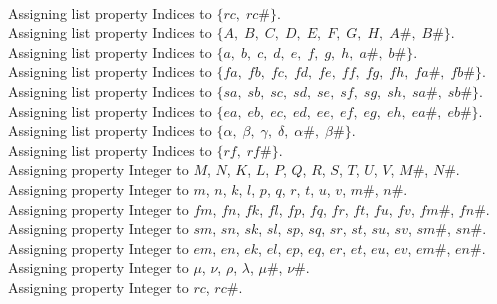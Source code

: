 \documentclass[11pt]{article}
\begin{document}
\\
Assigning list property Indices to $\{rc,\; rc\#\}$.
\\
Assigning list property Indices to $\{A,\; B,\; C,\; D,\; E,\; F,\; G,\; H,\; A\#,\; B\#\}$.
\\
Assigning list property Indices to $\{a,\; b,\; c,\; d,\; e,\; f,\; g,\; h,\; a\#,\; b\#\}$.
\\
Assigning list property Indices to $\{fa,\; fb,\; fc,\; fd,\; fe,\; ff,\; fg,\; fh,\; fa\#,\; fb\#\}$.
\\
Assigning list property Indices to $\{sa,\; sb,\; sc,\; sd,\; se,\; sf,\; sg,\; sh,\; sa\#,\; sb\#\}$.
\\
Assigning list property Indices to $\{ea,\; eb,\; ec,\; ed,\; ee,\; ef,\; eg,\; eh,\; ea\#,\; eb\#\}$.
\\
Assigning list property Indices to $\{\alpha,\; \beta,\; \gamma,\; \delta,\; \alpha\#,\; \beta\#\}$.
\\
Assigning list property Indices to $\{rf,\; rf\#\}$.
\\
Assigning property Integer to $M$, $N$, $K$, $L$, $P$, $Q$, $R$, $S$, $T$, $U$, $V$, $M\#$, $N\#$.
\\
Assigning property Integer to $m$, $n$, $k$, $l$, $p$, $q$, $r$, $t$, $u$, $v$, $m\#$, $n\#$.
\\
Assigning property Integer to $fm$, $fn$, $fk$, $fl$, $fp$, $fq$, $fr$, $ft$, $fu$, $fv$, $fm\#$, $fn\#$.
\\
Assigning property Integer to $sm$, $sn$, $sk$, $sl$, $sp$, $sq$, $sr$, $st$, $su$, $sv$, $sm\#$, $sn\#$.
\\
Assigning property Integer to $em$, $en$, $ek$, $el$, $ep$, $eq$, $er$, $et$, $eu$, $ev$, $em\#$, $en\#$.
\\
Assigning property Integer to $\mu$, $\nu$, $\rho$, $\lambda$, $\mu\#$, $\nu\#$.
\\
Assigning property Integer to $rc$, $rc\#$.
\\
\end{document}
